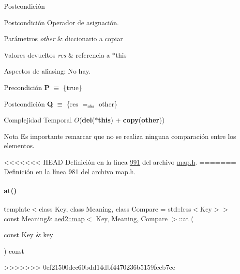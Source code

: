 \begin{DoxyPostcond}{\-Postcondición}
\begin{DoxyPostcond}{\-Postcondición}
Operador de asignación. 


\begin{DoxyParams}{Parámetros}
{\em other} & diccionario a copiar \\
\hline
\end{DoxyParams}

\begin{DoxyRetVals}{Valores devueltos}
{\em res} & referencia a $\ast$this\\
\hline
\end{DoxyRetVals}
\begin{DoxyParagraph}{Aspectos de aliasing\+:}
No hay.
\end{DoxyParagraph}
\begin{DoxyPrecond}{Precondición}
{\bfseries P} $\equiv$ \{true\} 
\end{DoxyPrecond}
\begin{DoxyPostcond}{Postcondición}
{\bfseries Q} $\equiv$ \{res $=_{obs}$ other\}
\end{DoxyPostcond}

\begin{DoxyDescription}
\item[Complejidad Temporal]$O$({\bfseries del}({\bfseries $\ast$this}) $+$ {\bfseries copy}({\bfseries other}))
\end{DoxyDescription}

\begin{DoxyNote}{Nota}
Es importante remarcar que no se realiza ninguna comparación entre los elementos. 
\end{DoxyNote}


<<<<<<< HEAD
\-Definición en la línea \hyperlink{map_8h_source_l00991}{991} del archivo \hyperlink{map_8h_source}{map.\-h}.
=======
Definición en la línea \hyperlink{map_8h_source_l00981}{981} del archivo \hyperlink{map_8h_source}{map.\+h}.

\mbox{\label{classaed2_1_1map_a579c9179b42175c23a1013ac7f1b876c_a579c9179b42175c23a1013ac7f1b876c}} 
\paragraph{\texorpdfstring{at()}{at()}\hspace{0.1cm}{\footnotesize\ttfamily [1/2]}}
{\footnotesize\ttfamily template$<$class Key, class Meaning, class Compare = std\+::less$<$\+Key$>$$>$ \\
const Meaning\& \hyperlink{classaed2_1_1map}{aed2\+::map}$<$ Key, Meaning, Compare $>$\+::at (\begin{DoxyParamCaption}\item[{const Key \&}]{key }\end{DoxyParamCaption}) const\hspace{0.3cm}{\ttfamily [inline]}}
>>>>>>> 0cf21500dcc60bdd14dbf4470236b5159feeb7ce




\end{DoxyPostcond}
\end{DoxyPostcond}
